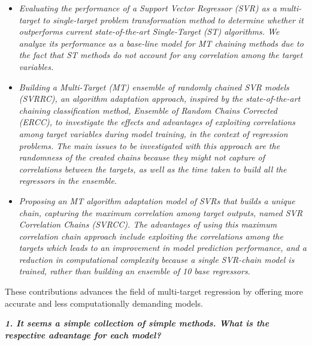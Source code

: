 \documentclass[a4paper,notitlepage]{article}
\begin{document}
\begin{itemize}
\item \textit{Evaluating the performance of a Support Vector Regressor (SVR) as a multi-target to single-target problem transformation method to determine whether it outperforms current state-of-the-art Single-Target (ST) algorithms. We analyze its performance as a base-line model for MT chaining methods due to the fact that ST methods do not account for any correlation among the target variables.}

\item \textit{Building a Multi-Target (MT) ensemble of randomly chained SVR models (SVRRC), an algorithm adaptation approach, inspired by the state-of-the-art chaining classification method, Ensemble of Random Chains Corrected (ERCC), to investigate the effects and advantages of exploiting correlations among target variables during model training, in the context of regression problems. The main issues to be investigated with this approach are the randomness of the created chains because they might not capture of correlations between the targets, as well as the time taken to build all the regressors in the ensemble.}

\item \textit{Proposing an MT algorithm adaptation model of SVRs that builds a unique chain, capturing the maximum correlation among target outputs, named SVR Correlation Chains (SVRCC). The advantages of using this maximum correlation chain approach include exploiting the correlations among the targets which leads to an improvement in model prediction performance, and a reduction in computational complexity because a single SVR-chain model is trained, rather than building an ensemble of 10 base regressors.}
\end{itemize}

\noindent These contributions advances the field of multi-target regression by offering more accurate and less computationally demanding models.

\noindent \textbf{\textit{1. It seems a simple collection of simple methods. What is the respective advantage for each model?}}
 
\medskip
\end{document}
